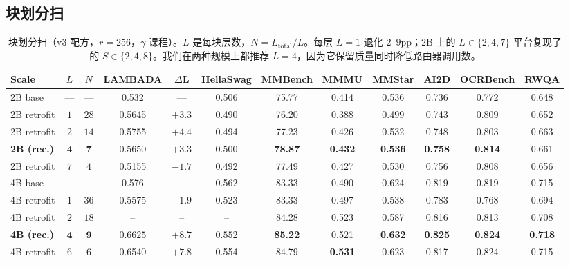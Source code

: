 \documentclass{article}
\begin{document}
\subsection{块划分扫}
\label{app:block_partition}
\begin{table}[h]
\caption{块划分扫（v3 配方，$r{=}256$，$\gamma$-课程）。$L$ 是每块层数，$N{=}L_{\text{total}}/L$。每层 $L{=}1$ 退化 $2$--$9$pp；$2$B 上的 $L\in\{2,4,7\}$ 平台复现了 \citet{chen2026attnres} 的 $S\in\{2,4,8\}$。我们在两种规模上都推荐 $L{=}4$，因为它保留质量同时降低路由器调用数。}
\label{tab:block_partition}
\centering\small
\setlength{\tabcolsep}{3pt}
\begin{tabular}{lccccccccccc}
\toprule
Scale & $L$ & $N$ & LAMBADA & $\Delta$L & HellaSwag & MMBench & MMMU & MMStar & AI2D & OCRBench & RWQA \\
\midrule
2B base       & --- & ---  & 0.532  & ---     & 0.506 & 75.77 & 0.414 & 0.536 & 0.736 & 0.772 & 0.648 \\
2B retrofit   & $1$ & $28$ & 0.5645 & $+3.3$  & 0.490 & 76.20 & 0.388 & 0.499 & 0.743 & 0.809 & 0.652 \\
2B retrofit   & $2$ & $14$ & 0.5755 & $+4.4$  & 0.494 & 77.23 & 0.426 & 0.532 & 0.748 & 0.803 & 0.663 \\
\textbf{2B (rec.)} & $\mathbf{4}$ & $\mathbf{7}$  & $\mathbf{0.5650}$ & $\mathbf{+3.3}$  & $\mathbf{0.500}$ & \textbf{78.87} & \textbf{0.432} & \textbf{0.536} & \textbf{0.758} & \textbf{0.814} & 0.661 \\
2B retrofit   & $7$ & $4$  & 0.5155 & $-1.7$  & 0.492 & 77.49 & 0.427 & 0.530 & 0.756 & 0.808 & 0.656 \\
\midrule
4B base       & --- & ---  & 0.576  & ---     & 0.562 & 83.33 & 0.490 & 0.624 & 0.819 & 0.819 & 0.715 \\
4B retrofit   & $1$ & $36$ & 0.5575 & $-1.9$  & 0.523 & 83.33 & 0.497 & 0.538 & 0.783 & 0.768 & 0.694 \\
4B retrofit   & $2$ & $18$ & --     & --      & --    & 84.28 & 0.523 & 0.587 & 0.816 & 0.813 & 0.708 \\
\textbf{4B (rec.)} & $\mathbf{4}$ & $\mathbf{9}$ & $\mathbf{0.6625}$ & $\mathbf{+8.7}$ & $\mathbf{0.552}$ & \textbf{85.22} & 0.521 & \textbf{0.632} & \textbf{0.825} & \textbf{0.824} & \textbf{0.718} \\
4B retrofit   & $6$ & $6$  & 0.6540 & $+7.8$  & 0.554 & 84.79 & \textbf{0.531} & 0.623 & 0.817 & 0.824 & 0.715 \\
\bottomrule
\end{tabular}
\end{table}
\end{document}

